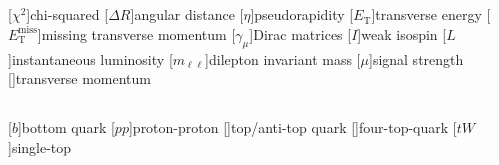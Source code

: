 \documentclass[thesis.tex]{subfiles}
\begin{document}
\begin{abbrev}

\subsection*{}
\begin{acronym}
	[$\chi^2$]{chi-squared}
	[$\Delta R$]{angular distance}
	[$\eta$]{pseudorapidity}
	[$E_\mathrm{T}$]{transverse energy}
	[$E_\mathrm{T}^\mathrm{miss}$]{missing transverse momentum}
	[$\gamma_\mu$]{Dirac matrices}
	[$I$]{weak isospin}
	[$L$]{instantaneous luminosity}
	[$m_{\ell\ell}$]{dilepton invariant mass}
	[$\mu$]{signal strength}
	[\pT]{transverse momentum}
\end{acronym}

\subsection*{}
\begin{acronym}
[$b$]{bottom quark}
[$pp$]{proton-proton}
[\ttbar]{top/anti-top quark}
[\tttt]{four-top-quark}
[$tW$]{single-top}
\end{acronym}


\end{abbrev}
\end{document}
